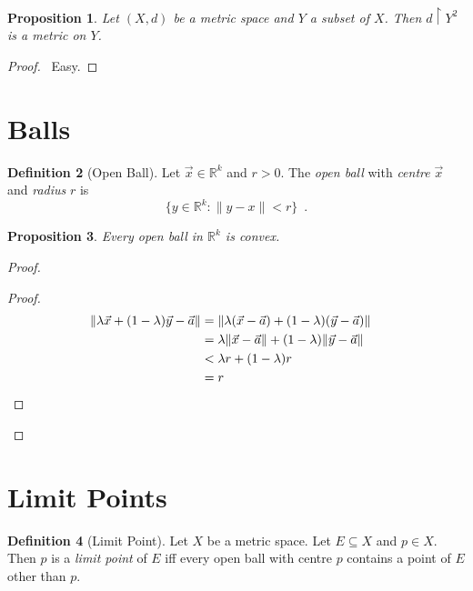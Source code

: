 \documentclass{book}
\let\qed\relax
\newtheorem{prop}{Proposition}[chapter]
\theoremstyle{definition}
\newtheorem{df}[prop]{Definition}
\begin{document}
\begin{prop}
Let $(X,d)$ be a metric space and $Y$ a subset of $X$. Then $d \restriction Y^2$ is a metric on $Y$.
\end{prop}

\begin{proof}
\pf\ Easy. \qed
\end{proof}

\section{Balls}

\begin{df}[Open Ball]
Let $\vec{x} \in \mathbb{R}^k$ and $r > 0$. The \emph{open ball} with \emph{centre} $\vec{x}$ and \emph{radius} $r$ is
\[ \{ y \in \mathbb{R}^k : \| y - x \| < r \} \enspace . \]
\end{df}

\begin{prop}
Every open ball in $\mathbb{R}^k$ is convex.
\end{prop}

\begin{proof}
\pf
{}
\begin{proof}
\pf
\begin{align*}
\| \lambda \vec{x} + (1 - \lambda) \vec{y} - \vec{a} \|
& = \| \lambda (\vec{x} - \vec{a}) + (1 - \lambda) (\vec{y} - \vec{a}) \| \\
& = \lambda \| \vec{x} - \vec{a} \| + (1 - \lambda) \| \vec{y} - \vec{a} \| \\
& < \lambda r + (1 - \lambda) r \\
& = r & \qed
\end{align*}
\end{proof}
\qed
\end{proof}

\section{Limit Points}

\begin{df}[Limit Point]
Let $X$ be a metric space. Let $E \subseteq X$ and $p \in X$. Then $p$ is a \emph{limit point} of $E$ iff every open ball with centre $p$ contains a point of $E$ other than $p$.
\end{df}
\end{document}
